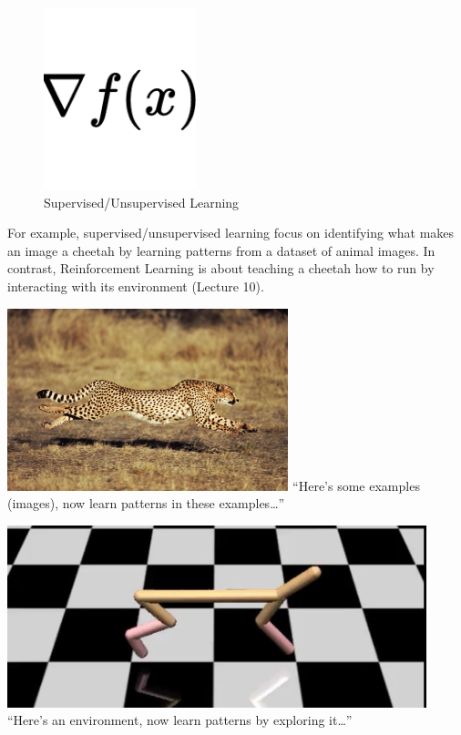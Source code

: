 \documentclass[
  letterpaper,
  DIV=11,
  numbers=noendperiod]{scrreprt}
\begin{document}
\begin{figure}[H]

{\centering \includegraphics[width=0.25\linewidth,height=2.08333in]{lecture1/images/nabla.drawio.png}

}

\caption{Supervised/Unsupervised Learning}

\end{figure}%

For example, supervised/unsupervised learning focus on identifying what
makes an image a cheetah by learning patterns from a dataset of animal
images. In contrast, Reinforcement Learning is about teaching a cheetah
how to run by interacting with its environment (Lecture 10).

\includegraphics[width=1\linewidth,height=2.08333in]{lecture1/images/cheetah.jpg}
``Here's some examples (images), now learn patterns in these
examples\ldots{}''

\includegraphics[width=1\linewidth,height=2.08333in]{lecture1/images/cheetahopenai.jpg}
``Here's an environment, now learn patterns by exploring it\ldots{}''
\end{document}
